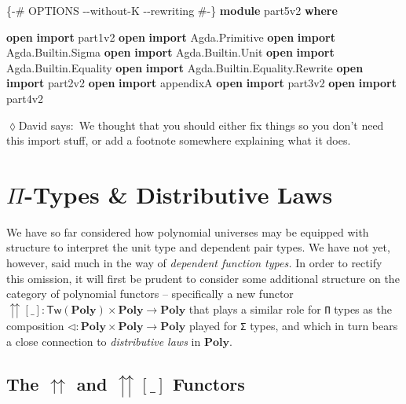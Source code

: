 \documentclass[
  11pt,
  oneside,
  article]{memoir}
\newenvironment{Shaded}{}{}
\newcommand{\KeywordTok}[1]{\textcolor[rgb]{0.00,0.44,0.13}{\textbf{#1}}}
\newcommand{\NormalTok}[1]{#1}
\newcommand{\OtherTok}[1]{\textcolor[rgb]{0.00,0.44,0.13}{#1}}
\newcommand{\PreprocessorTok}[1]{\textcolor[rgb]{0.74,0.48,0.00}{#1}}
\theoremstyle{definition}
\theoremstyle{plain}
\newcommand{\Cat}[1]{\mathbf{#1}}%
\newcommand{\poly}{\Cat{Poly}}
\newcommand{\0}{\textsf{0}}
\newcommand{\1}{\tn{\textsf{1}}}
\newcommand{\dnote}[1]{{\quad \color{blue}$\lozenge$\;David says:}~#1\;{\color{blue}$\lozenge$}\quad}
\begin{document}
\begin{Shaded}
\begin{Highlighting}[]
\PreprocessorTok{\{{-}\# OPTIONS {-}{-}without{-}K {-}{-}rewriting \#{-}\}}
\KeywordTok{module}\NormalTok{ part5v2 }\KeywordTok{where}

\KeywordTok{open} \KeywordTok{import}\NormalTok{ part1v2}
\KeywordTok{open} \KeywordTok{import}\NormalTok{ Agda}\OtherTok{.}\NormalTok{Primitive}
\KeywordTok{open} \KeywordTok{import}\NormalTok{ Agda}\OtherTok{.}\NormalTok{Builtin}\OtherTok{.}\NormalTok{Sigma}
\KeywordTok{open} \KeywordTok{import}\NormalTok{ Agda}\OtherTok{.}\NormalTok{Builtin}\OtherTok{.}\NormalTok{Unit}
\KeywordTok{open} \KeywordTok{import}\NormalTok{ Agda}\OtherTok{.}\NormalTok{Builtin}\OtherTok{.}\NormalTok{Equality}
\KeywordTok{open} \KeywordTok{import}\NormalTok{ Agda}\OtherTok{.}\NormalTok{Builtin}\OtherTok{.}\NormalTok{Equality}\OtherTok{.}\NormalTok{Rewrite}
\KeywordTok{open} \KeywordTok{import}\NormalTok{ part2v2}
\KeywordTok{open} \KeywordTok{import}\NormalTok{ appendixA}
\KeywordTok{open} \KeywordTok{import}\NormalTok{ part3v2}
\KeywordTok{open} \KeywordTok{import}\NormalTok{ part4v2}
\end{Highlighting}
\end{Shaded}
\dnote{We thought that you should either fix things so you don't need this import stuff, or add a footnote somewhere explaining what it does.}

\chapter{\texorpdfstring{\(\Pi\)-Types \& Distributive
Laws}{\textbackslash Pi-Types \& Distributive Laws}}\label{pi-types-distributive-laws}

We have so far considered how polynomial universes may be equipped with
structure to interpret the unit type and dependent pair types. We have
not yet, however, said much in the way of \emph{dependent function
types.} In order to rectify this omission, it will first be prudent to
consider some additional structure on the category of polynomial
functors -- specifically a new functor
\({\upuparrows}[\_] : \mathsf{Tw}(\poly) \times \poly \to \poly\)
that plays a similar role for \texttt{Π} types as the composition
\(\triangleleft : \poly \times \poly \to \poly\)
played for \texttt{Σ} types, and which in turn bears a close connection
to \emph{distributive laws} in \(\poly\).

\section{\texorpdfstring{The \(\upuparrows\) and \({\upuparrows}[\_]\)
Functors}{The \textbackslash upuparrows and \{\textbackslash upuparrows\}{[}\textbackslash\_{]} Functors}}\label{the-upuparrows-and-upuparrows_-functors}
\end{document}
